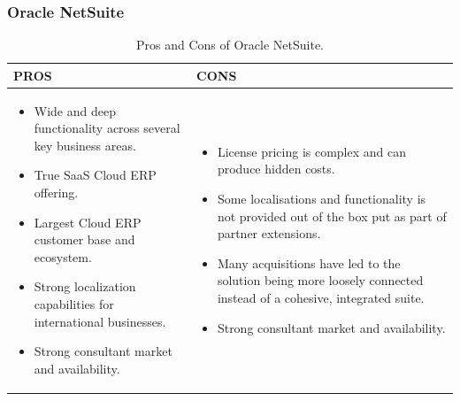\subsubsection{Oracle NetSuite}
\begin{table}
    \centering
    \begin{tabular}{|p{}|p{}|}
        \hline
        \textbf{PROS} & \textbf{CONS}                                                                                         \\ \hline
        \begin{itemize}
            \item Wide and deep functionality across several key business areas.
            \item True SaaS Cloud ERP offering.
            \item Largest Cloud ERP customer base and ecosystem.
            \item Strong localization capabilities for international businesses.
            \item Strong consultant market and availability.
        \end{itemize}
                      &
        \begin{itemize}
            \item License pricing is complex and can produce hidden costs.
            \item Some localisations and functionality is not provided out of the box put as part of partner extensions.
            \item Many acquisitions have led to the solution being more loosely connected instead of a cohesive, integrated suite.
            \item Strong consultant market and availability.
        \end{itemize} \\ \hline
    \end{tabular}
    \caption{Pros and Cons of Oracle NetSuite.}
    \label{tab:oracle_pros_cons}
\end{table}
